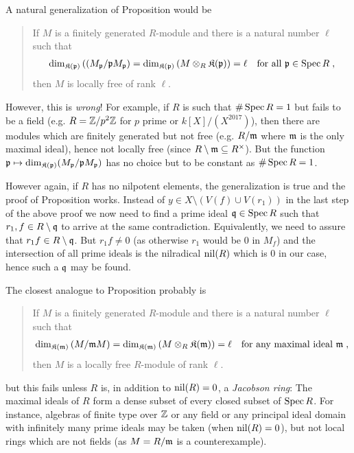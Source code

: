 \documentclass[a4paper,parskip=half,numbers=enddot, DIV=12]{scrreprt}
\begin{document}
\begin{rem*}
    \begin{alphanumerate}
      \item 
        A natural generalization of Proposition  would be
        \begin{quote}
            If $M$ is a finitely generated $R$-module and there is a natural number $\ell$ such that
            \begin{align*}
            	\dim_{\mathfrak{K}(\mathfrak{p})}\left((M_{\mathfrak{p}}/\mathfrak{p} M_{\mathfrak{p}}\right) = \dim_{\mathfrak{K}(\mathfrak{p})}\left( M \otimes_R \mathfrak{K}(\mathfrak{p})\right)=\ell\quad\text{for all }\mathfrak{p}\in \operatorname{Spec} R\;,
            \end{align*}
             then $M$ is locally free of rank $\ell$.
        \end{quote}
        However, this is \emph{wrong}! For example, if $R$ is such that $\#\operatorname{Spec} R=1$ but fails to be a field (e.g. $R=\mathbb{Z}/p^2\mathbb{Z}$ for $p$ prime or $k[X]/(X^{2017})$), then there are modules which are finitely generated but not free (e.g. $R/\mathfrak{m}$ where $\mathfrak{m}$ is the only maximal ideal), hence not locally free (since $R\setminus \mathfrak{m}\subseteq R^\times$). But the function $\mathfrak{p}\mapsto \dim_{\mathfrak{K}(\mathfrak{p})}(M_{\mathfrak{p}}/\mathfrak{p} M_{\mathfrak{p}})$ has no choice but to be constant as $\#\operatorname{Spec} R = 1$. 
        
        However again,  if $R$ has no nilpotent elements, the generalization is true and the proof of Proposition  works. Instead of $y\in X\setminus(V(f)\cup V(r_1))$ in the last step of the above proof we now need to find a prime ideal $\mathfrak{q}\in\operatorname{Spec} R$ such that $r_1,f\in R\setminus\mathfrak{q}$ to arrive at the same contradiction. Equivalently, we need to assure that $r_1f\in R\setminus\mathfrak{q}$. But $r_1f\not=0$ (as otherwise $r_1$ would be $0$ in $M_f$) and the intersection of all prime ideals is the nilradical $\operatorname{nil}(R)$ which is $0$ in our case, hence such a $\mathfrak{q}$ may be found.
      \item 
        The closest analogue to Proposition  probably is
        \begin{quote}
            If $M$ is a finitely generated $R$-module and there is a natural number $\ell$ such that 
            \begin{align*}
            	\dim_{\mathfrak{K}(\mathfrak{m})} \left(M/\mathfrak{m} M\right) = \dim_{\mathfrak{K}(\mathfrak{m})} \left(M\otimes_R \mathfrak{K}(\mathfrak{m})\right) = \ell\quad\text{for any maximal ideal }\mathfrak{m}\;, 
            \end{align*}
            then $M$ is a locally free $R$-module of rank $\ell$.
        \end{quote}
        but this fails unless $R$ is, in addition to $\operatorname{nil}(R) = 0$, a \emph{Jacobson ring}: The maximal ideals of $R$ form a dense subset of every closed subset of $\operatorname{Spec} R$. For instance, algebras of finite type over $\mathbb{Z}$ or any field or any principal ideal domain with infinitely many prime ideals may be taken (when $\operatorname{nil}(R) = 0$), but not local rings which are not fields (as $M=R/\mathfrak{m}$ is a counterexample).

    \end{alphanumerate}
\end{rem*}
\end{document}
